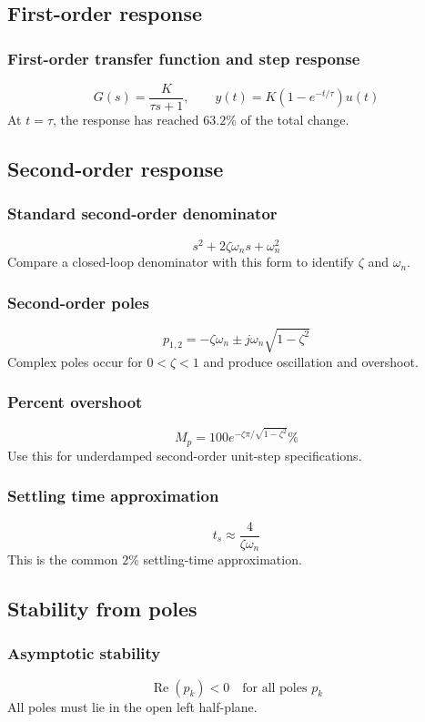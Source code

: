 \subsection{First-order response}

\subsubsection{First-order transfer function and step response}
\[
G(s)=\frac{K}{\tau s+1},\qquad
y(t)=K\left(1-e^{-t/\tau}\right)u(t)
\]
At \(t=\tau\), the response has reached \(63.2\%\) of the total change.

\subsection{Second-order response}

\subsubsection{Standard second-order denominator}
\[
s^2+2\zeta\omega_n s+\omega_n^2
\]
Compare a closed-loop denominator with this form to identify \(\zeta\) and \(\omega_n\).

\subsubsection{Second-order poles}
\[
p_{1,2}=-\zeta\omega_n\pm j\omega_n\sqrt{1-\zeta^2}
\]
Complex poles occur for \(0<\zeta<1\) and produce oscillation and overshoot.

\subsubsection{Percent overshoot}
\[
M_p=100e^{-\zeta\pi/\sqrt{1-\zeta^2}}\%
\]
Use this for underdamped second-order unit-step specifications.

\subsubsection{Settling time approximation}
\[
t_s\approx\frac{4}{\zeta\omega_n}
\]
This is the common \(2\%\) settling-time approximation.

\subsection{Stability from poles}

\subsubsection{Asymptotic stability}
\[
\operatorname{Re}(p_k)<0\quad\text{for all poles }p_k
\]
All poles must lie in the open left half-plane.

